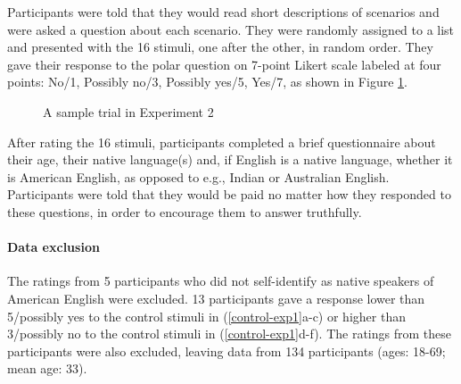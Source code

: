 \documentclass[11pt,fleqn]{article}
\newcommand{\6}{\mbox{$[\hspace*{-.6mm}[$}}
\newcommand{\9}{\mbox{$]\hspace*{-.6mm}]$}}
\begin{document}
Participants were told that they would read short descriptions of scenarios and were asked a question about each scenario. They were randomly assigned to a list and presented with the 16 stimuli, one after the other, in random order. They gave their response to the polar question on 7-point Likert scale labeled at four points: No/1, Possibly
no/3, Possibly yes/5, Yes/7, as shown in Figure \ref{f-trial-exp1}. 

\begin{figure}[h!]
\centering


\caption{A sample trial in Experiment 2}\label{f-trial-exp1}
\end{figure}

After rating the 16 stimuli, participants completed a brief questionnaire about their age, their
native language(s) and, if English is a native language, whether it is
American English, as opposed to e.g., Indian or Australian English.
Participants were told that they would be paid no matter how they
responded to these questions, in order to encourage them to answer
truthfully.


\paragraph{Data exclusion} The ratings from 5 participants who did not self-identify as native speakers of American English were excluded. 13 participants gave a response lower than 5/possibly yes to the control stimuli in (\ref{control-exp1}a-c) or higher than 3/possibly no to the control stimuli in (\ref{control-exp1}d-f). The ratings from these participants were also excluded, leaving data from 134 participants (ages: 18-69; mean age: 33).
\end{document}
